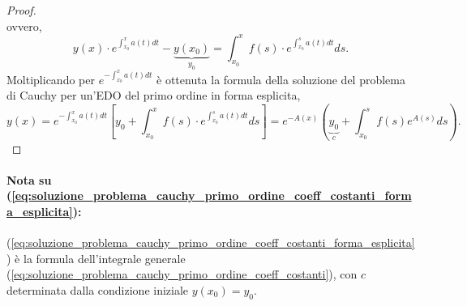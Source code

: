 \begin{proof}
\begin{equation*}
	\end{equation*}
	ovvero,
	\begin{equation*}
		y(x)\cdot e^{\int_{x_0}^xa(t)dt}-\underbrace{y(x_0)}_{y_0}=\int_{x_0}^x f(s)\cdot e^{\int_{x_0}^sa(t)dt}ds.
	\end{equation*}
	Moltiplicando per $e^{-\int_{x_0}^xa(t)dt}$ è ottenuta la formula della soluzione del problema di Cauchy per un'EDO del primo ordine in forma esplicita,
	\begin{equation}\label{eq:soluzione_problema_cauchy_primo_ordine_coeff_costanti_forma_esplicita}
		y(x)= e^{-\int_{x_0}^xa(t) dt}\left[y_0+\int_{x_0}^x f(s)\cdot e^{\int_{x_0}^sa(t)dt}ds\right]=e^{-A(x)}\left(\underbrace{y_0}_c + \int_{x_0}^s f(s) e^{A(s)}ds\right).
	\end{equation}
\end{proof}

\paragraph{Nota su (\ref{eq:soluzione_problema_cauchy_primo_ordine_coeff_costanti_forma_esplicita}):} (\ref{eq:soluzione_problema_cauchy_primo_ordine_coeff_costanti_forma_esplicita}) è la formula dell'integrale generale (\ref{eq:soluzione_problema_cauchy_primo_ordine_coeff_costanti}), con $c$ determinata dalla condizione iniziale $y(x_0)=y_0$.

